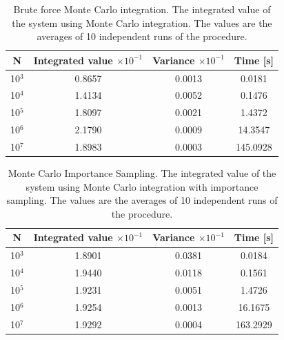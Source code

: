\documentclass[%
reprint,nofootinbib,
amsmath,amssymb,
aps,
]{revtex4-1}
\begin{document}
\begin{table}[!h]
	\caption{Brute force Monte Carlo integration. 	\label{mc_values} \centering The integrated value of the system using Monte Carlo integration. The values are the averages of 10 independent runs of the procedure. }
	\begin{tabular}{|c|c|c|c|}
		\hline 
		\hspace{5mm} \textbf{N} \hspace{5mm} & \textbf{Integrated value} $\times 10^{-1}$& \hspace{3mm} \textbf{Variance} $\times 10^{-1}$ & \hspace{3mm} \textbf{Time  [s]} \hspace{5mm}\\
		\hline 
			10$^3$ & 0.8657  & 0.0013  & 0.0181 \\
			10$^4$  & 1.4134  & 0.0052  & 0.1476 \\
			10$^5$  & 1.8097  & 0.0021  & 1.4372 \\
			10$^6$  & 2.1790  & 0.0009  & 14.3547 \\
			10$^7$  & 1.8983  & 0.0003  & 145.0928 \\
		\hline 
	\end{tabular}
\end{table}


\begin{table}[!h]
	\caption{Monte Carlo Importance Sampling. \label{mc_values_is} \centering The integrated value of the system using Monte Carlo integration with importance sampling. The values are the averages of 10 independent runs of the procedure.}
	\begin{tabular}{|c|c|c|c|}
		\hline 
		\hspace{5mm} \textbf{N} \hspace{5mm} & \textbf{Integrated value} $\times 10^{-1}$& \hspace{3mm} \textbf{Variance}  $\times 10^{-1}$& \hspace{3mm} \textbf{Time  [s]} \hspace{5mm}\\
		\hline 
			10$^3$ & 1.8901  & 0.0381  & 0.0184 \\
			10$^4$ & 1.9440  & 0.0118  & 0.1561 \\
			10$^5$ & 1.9231  & 0.0051  & 1.4726 \\
			10$^6$ & 1.9254  & 0.0013  & 16.1675 \\
			10$^7$ & 1.9292  & 0.0004  & 163.2929 \\

		\hline 
	\end{tabular}
\end{table}
\end{document}
